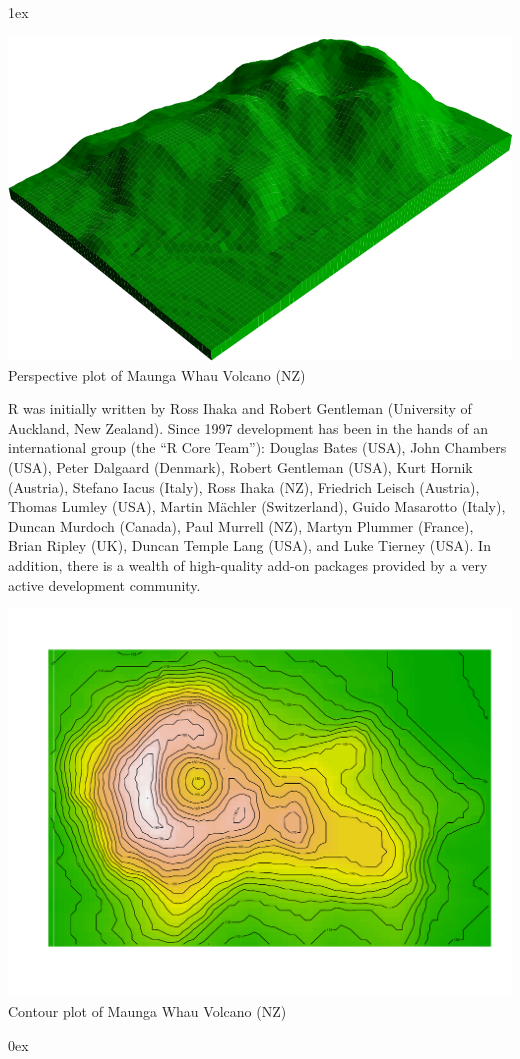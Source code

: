 \documentclass[landscape]{article}
\newlength{\colw}
\newcommand{\column}[1]{\hspace*{9mm}{}
  \parbox[t][0.99\textheight][t]{\colw}{\parskip1ex
    #1\parskip0ex}\hspace{9mm}{}}
\begin{document}
\column{
  \begin{center}
    \footnotesize\sf
    \includegraphics[width=0.85\colw]{volcano-persp}\\
    Perspective plot of Maunga Whau Volcano (NZ)
  \end{center}
  
  R was initially written by Ross Ihaka and Robert Gentleman
  (University of Auckland, New Zealand).  Since 1997 development has
  been in the hands of an international group (the ``R Core Team''):
  Douglas Bates (USA), John Chambers (USA), Peter Dalgaard (Denmark),
  Robert Gentleman (USA), Kurt Hornik (Austria), Stefano Iacus
  (Italy), Ross Ihaka (NZ), Friedrich Leisch (Austria), Thomas Lumley
  (USA), Martin M{\"a}chler (Switzerland), Guido Masarotto (Italy),
  Duncan Murdoch (Canada), Paul Murrell (NZ), Martyn Plummer (France),
  Brian Ripley (UK), Duncan Temple Lang (USA), and Luke Tierney (USA).
  In addition, there is a wealth of high-quality add-on packages
  provided by a very active development community.
  \begin{center}
    \footnotesize\sf
    \includegraphics[width=0.85\colw]{volcano-image}\\
    Contour plot of Maunga Whau Volcano (NZ)
  \end{center}
}
\end{document}

